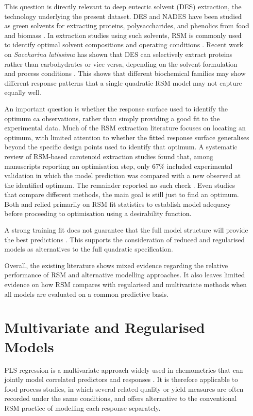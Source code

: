 \documentclass[MScDSA]{uccthesis}
\begin{document}
This question is directly relevant to deep eutectic solvent (DES) extraction, the technology underlying the present dataset. DES and NADES have been studied as green solvents for extracting proteins, polysaccharides, and phenolics from food and biomass \parencite{Dai:2013}. In extraction studies using such solvents, RSM is commonly used to identify optimal solvent compositions and operating conditions \parencite{Wan:2015}. Recent work on \textit{Saccharina latissima} has shown that DES can selectively extract proteins rather than carbohydrates or vice versa, depending on the solvent formulation and process conditions \parencite{Moldes:2024}. This shows that different biochemical families may show different response patterns that a single quadratic RSM model may not capture equally well.

An important question is whether the response surface used to identify the optimum ca observations, rather than simply providing a good fit to the experimental data. Much of the RSM extraction literature focuses on locating an optimum, with limited attention to whether the fitted response surface generalises beyond the specific design points used to identify that optimum. A systematic review of RSM-based carotenoid extraction studies found that, among manuscripts reporting an optimisation step, only 67\% included experimental validation in which the model prediction was compared with a new observed at the identified optimum. The remainder reported no such check \parencite{CanoLamadrid:2023}. Even studies that compare different methods, the main goal is still just to find an optimum. Both \parencite{Mehdaoui:2025} and \parencite{Ahmad:2024} relied primarily on RSM fit statistics to establish model adequacy before proceeding to optimisation using a desirability function. 

A strong training fit does not guarantee that the full model structure will provide the best predictions \parencite{Smucker:2021}. This supports the consideration of reduced and regularised models as alternatives to the full quadratic specification.

Overall, the existing literature shows mixed evidence regarding the relative performance of RSM and alternative modelling approaches. It also leaves limited evidence on how RSM compares with regularised and multivariate methods when all models are evaluated on a common predictive basis. 

\section{Multivariate and Regularised Models}
\label{sec:multivariate_and_reg_modelling}
PLS regression is a multivariate approach widely used in chemometrics that can jointly model correlated predictors and responses \parencite{Wold:2001}. It is therefore applicable to food-process studies, in which several related quality or yield measures are often recorded under the same conditions, and  offers alternative to the conventional RSM practice of modelling each response separately. 
\end{document}
